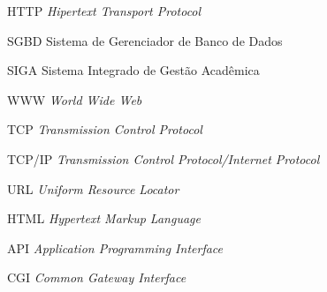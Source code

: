 \begin{siglas}
  \item[HTTP] \textit{Hipertext Transport Protocol}
  \item[SGBD] Sistema de Gerenciador de Banco de Dados
  \item[SIGA] Sistema Integrado de Gestão Acadêmica
  \item[WWW] \textit{World Wide Web}
  \item[TCP] \textit{Transmission Control Protocol}
  \item[TCP/IP] \textit{Transmission Control Protocol/Internet Protocol	}
  \item[URL] \textit{Uniform Resource Locator}
  \item[HTML] \textit{Hypertext Markup Language}
  \item[API] \textit{Application Programming Interface}
  \item[CGI] \textit{Common Gateway Interface}
\end{siglas}